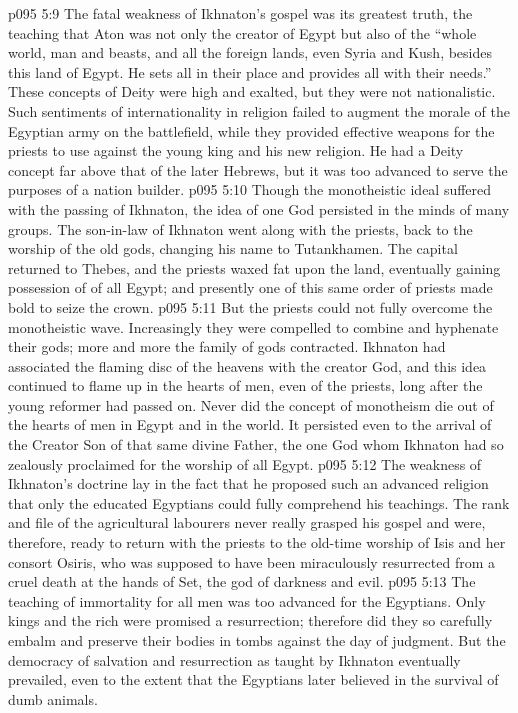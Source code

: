 \vs p095 5:9 The fatal weakness of Ikhnaton’s gospel was its greatest truth, the teaching that Aton was not only the creator of Egypt but also of the “whole world, man and beasts, and all the foreign lands, even Syria and Kush, besides this land of Egypt. He sets all in their place and provides all with their needs.” These concepts of Deity were high and exalted, but they were not nationalistic. Such sentiments of internationality in religion failed to augment the morale of the Egyptian army on the battlefield, while they provided effective weapons for the priests to use against the young king and his new religion. He had a Deity concept far above that of the later Hebrews, but it was too advanced to serve the purposes of a nation builder.
\vs p095 5:10 \pc Though the monotheistic ideal suffered with the passing of Ikhnaton, the idea of one God persisted in the minds of many groups. The son\hyp{}in\hyp{}law of Ikhnaton went along with the priests, back to the worship of the old gods, changing his name to Tutankhamen. The capital returned to Thebes, and the priests waxed fat upon the land, eventually gaining possession of  of all Egypt; and presently one of this same order of priests made bold to seize the crown.
\vs p095 5:11 But the priests could not fully overcome the monotheistic wave. Increasingly they were compelled to combine and hyphenate their gods; more and more the family of gods contracted. Ikhnaton had associated the flaming disc of the heavens with the creator God, and this idea continued to flame up in the hearts of men, even of the priests, long after the young reformer had passed on. Never did the concept of monotheism die out of the hearts of men in Egypt and in the world. It persisted even to the arrival of the Creator Son of that same divine Father, the one God whom Ikhnaton had so zealously proclaimed for the worship of all Egypt.
\vs p095 5:12 The weakness of Ikhnaton’s doctrine lay in the fact that he proposed such an advanced religion that only the educated Egyptians could fully comprehend his teachings. The rank and file of the agricultural labourers never really grasped his gospel and were, therefore, ready to return with the priests to the old\hyp{}time worship of Isis and her consort Osiris, who was supposed to have been miraculously resurrected from a cruel death at the hands of Set, the god of darkness and evil.
\vs p095 5:13 The teaching of immortality for all men was too advanced for the Egyptians. Only kings and the rich were promised a resurrection; therefore did they so carefully embalm and preserve their bodies in tombs against the day of judgment. But the democracy of salvation and resurrection as taught by Ikhnaton eventually prevailed, even to the extent that the Egyptians later believed in the survival of dumb animals.
